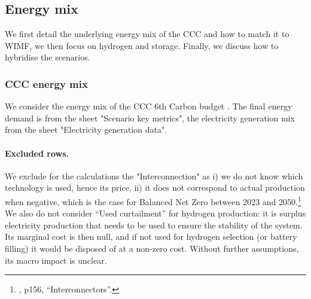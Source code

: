 




\subsection{Energy mix}
\label{app_energy_mix}

We first detail the underlying energy mix of the CCC and how to match it to WIMF, we then focus on hydrogen and storage. Finally, we discuss how to hybridise the scenarios.


\subsubsection{CCC energy mix}

We consider the energy mix of the CCC 6th Carbon budget \citep{cccSixthCarbonBudget2020, cccMethodologyReportSixth2020}.
The final energy demand is from the sheet "Scenario key metrics", the electricity generation mix from the sheet "Electricity generation data". 

\paragraph{Excluded rows.}
We exclude for the calculations the "Interconnection" as i) we do not know which technology is used, hence its price, ii) it does not correspond to actual production when negative, which is the case for Balanced Net Zero between 2023 and 2050.\footnote{\cite{cccMethodologyReportSixth2020}, p156, ``Interconnectors''.} We also do not consider ``Used curtailment'' for hydrogen production: it is surplus electricity production that needs to be used to ensure the stability of the system. Its marginal cost is then null, and if not used for hydrogen selection (or battery filling) it would be disposed of at a non-zero cost. Without further assumptions, its macro impact is unclear. 

